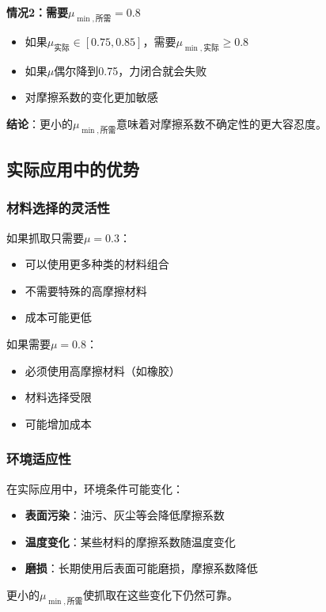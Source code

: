 \documentclass[12pt,a4paper]{article}
\begin{document}
\textbf{情况2：需要$\mu_{\min,\text{所需}} = 0.8$}
\begin{itemize}
    \item 如果$\mu_{\text{实际}} \in [0.75, 0.85]$，需要$\mu_{\min,\text{实际}} \geq 0.8$
    \item 如果$\mu$偶尔降到0.75，力闭合就会失败
    \item 对摩擦系数的变化更加敏感
\end{itemize}

\textbf{结论}：更小的$\mu_{\min,\text{所需}}$意味着对摩擦系数不确定性的更大容忍度。

\subsection{实际应用中的优势}

\subsubsection{材料选择的灵活性}

如果抓取只需要$\mu = 0.3$：
\begin{itemize}
    \item 可以使用更多种类的材料组合
    \item 不需要特殊的高摩擦材料
    \item 成本可能更低
\end{itemize}

如果需要$\mu = 0.8$：
\begin{itemize}
    \item 必须使用高摩擦材料（如橡胶）
    \item 材料选择受限
    \item 可能增加成本
\end{itemize}

\subsubsection{环境适应性}

在实际应用中，环境条件可能变化：
\begin{itemize}
    \item \textbf{表面污染}：油污、灰尘等会降低摩擦系数
    \item \textbf{温度变化}：某些材料的摩擦系数随温度变化
    \item \textbf{磨损}：长期使用后表面可能磨损，摩擦系数降低
\end{itemize}

更小的$\mu_{\min,\text{所需}}$使抓取在这些变化下仍然可靠。
\end{document}
